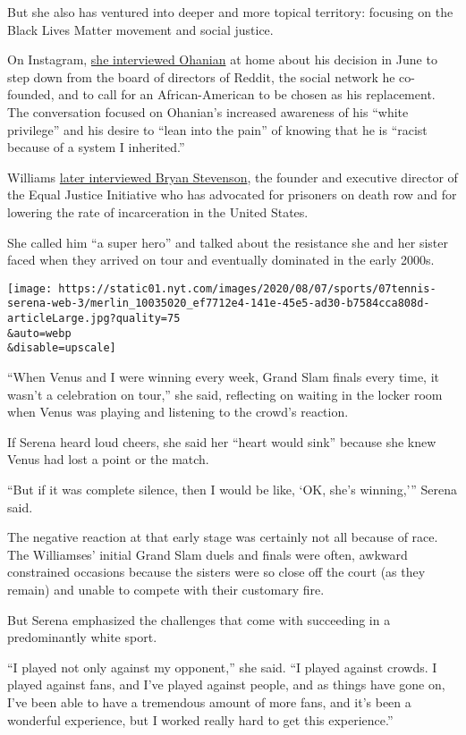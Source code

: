 But she also has ventured into deeper and more topical territory:
focusing on the Black Lives Matter movement and social justice.

On Instagram, \href{https://www.instagram.com/tv/CBHFg2fH-Uz/?hl=en}{she
interviewed Ohanian} at home about his decision in June to step down
from the board of directors of Reddit, the social network he co-founded,
and to call for an African-American to be chosen as his replacement. The
conversation focused on Ohanian's increased awareness of his ``white
privilege'' and his desire to ``lean into the pain'' of knowing that he
is ``racist because of a system I inherited.''

Williams \href{https://www.instagram.com/tv/CBuFfWIq4Q0/?hl=en}{later
interviewed Bryan Stevenson}, the founder and executive director of the
Equal Justice Initiative who has advocated for prisoners on death row
and for lowering the rate of incarceration in the United States.

She called him ``a super hero'' and talked about the resistance she and
her sister faced when they arrived on tour and eventually dominated in
the early 2000s.

\texttt{[image: https://static01.nyt.com/images/2020/08/07/sports/07tennis-serena-web-3/merlin\_10035020\_ef7712e4-141e-45e5-ad30-b7584cca808d-articleLarge.jpg?quality=75\\\&auto=webp\\\&disable=upscale]}

``When Venus and I were winning every week, Grand Slam finals every
time, it wasn't a celebration on tour,'' she said, reflecting on waiting
in the locker room when Venus was playing and listening to the crowd's
reaction.

If Serena heard loud cheers, she said her ``heart would sink'' because
she knew Venus had lost a point or the match.

``But if it was complete silence, then I would be like, `OK, she's
winning,''' Serena said.

The negative reaction at that early stage was certainly not all because
of race. The Williamses' initial Grand Slam duels and finals were often,
awkward constrained occasions because the sisters were so close off the
court (as they remain) and unable to compete with their customary fire.

But Serena emphasized the challenges that come with succeeding in a
predominantly white sport.

``I played not only against my opponent,'' she said. ``I played against
crowds. I played against fans, and I've played against people, and as
things have gone on, I've been able to have a tremendous amount of more
fans, and it's been a wonderful experience, but I worked really hard to
get this experience.''

